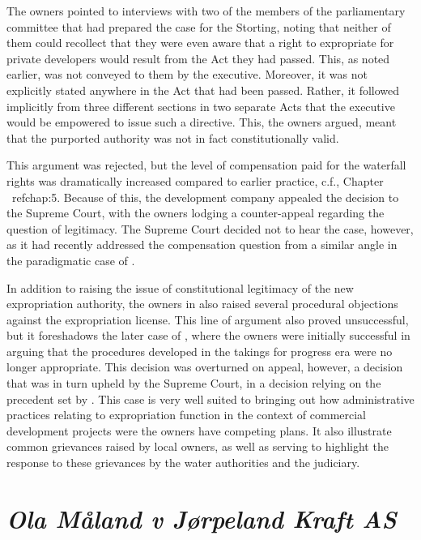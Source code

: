 The owners pointed to interviews with two of the members of the parliamentary committee that had prepared the case for the Storting, noting that neither of them could recollect that they were even aware that a right to expropriate for private developers would result from the Act they had passed. This, as noted earlier, was not conveyed to them by the executive. Moreover, it was not explicitly stated anywhere in the Act that had been passed. Rather, it followed implicitly from three different sections in two separate Acts that the executive would be empowered to issue such a directive. This, the owners argued, meant that the purported authority was not in fact constitutionally valid.

This argument was rejected, but the level of compensation paid for the waterfall rights was dramatically increased compared to earlier practice, c.f., Chapter \ ref{chap:5}. Because of this, the development company appealed the decision to the Supreme Court, with the owners lodging a counter-appeal regarding the question of legitimacy. The Supreme Court decided not to hear the case, however, as it had recently addressed the compensation question from a similar angle in the paradigmatic case of \cite{møllen08}.

In addition to raising the issue of constitutional legitimacy of the new expropriation authority, the owners in \cite{sauda08} also raised several procedural objections against the expropriation license. This line of argument also proved unsuccessful, but it foreshadows the later case of \cite{måland13}, where the owners were initially successful in arguing that the procedures developed in the takings for progress era were no longer appropriate. This decision was overturned on appeal, however, a decision that was in turn upheld by the Supreme Court, in a decision relying on the precedent set by \cite{alta82}. This case is very well suited to bringing out how administrative practices relating to expropriation function in the context of commercial development projects were the owners have competing plans. It also illustrate common grievances raised by local owners, as well as serving to highlight the response to these grievances by the water authorities and the judiciary.

\section{{\it Ola Måland v Jørpeland Kraft AS}}

